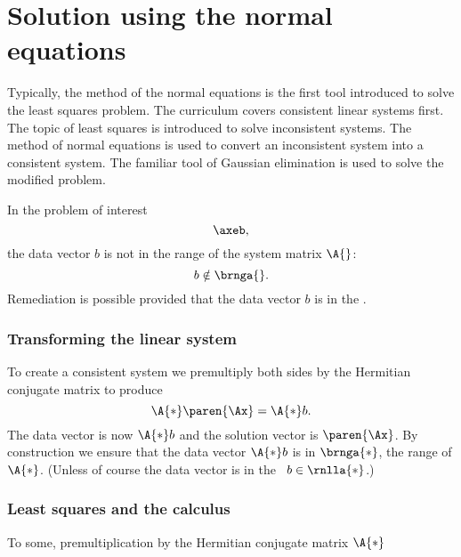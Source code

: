 \section{Solution using the normal equations}

Typically, the method of the normal equations is the first tool introduced to solve the least squares problem. The curriculum covers consistent linear systems first. The topic of least squares is introduced to solve inconsistent systems. The method of normal equations is used to convert an inconsistent system into a consistent system. The familiar tool of Gaussian elimination is used to solve the modified problem.

In the problem of interest
\begin{equation*}
  \axeb,
\end{equation*}
the data vector $b$ is not in the range of the system matrix $\A{}$:
\begin{equation}
  b \notin \brnga{}.
\end{equation}
Remediation is possible provided that the data vector $b$ is in the \ns. 

\subsubsection{Transforming the linear system}
To create a consistent system we premultiply both sides by the Hermitian conjugate matrix to produce
\begin{equation}
  \A{*} \paren{\Ax} = \A{*} b.
\end{equation}
The data vector is now $\A{*} b$ and the solution vector is $\paren{\Ax}$. By construction we ensure that the data vector $\A{*} b$ is in $\brnga{*}$, the range of $\A{*}$. (Unless of course the data vector is in the \ns \  $b \in \rnlla{*}$.)




\subsubsection{Least squares and the calculus}
To some, premultiplication by the Hermitian conjugate matrix $\A{*}$



\endinput